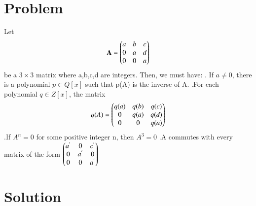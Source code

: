 \documentclass[journal,12pt,twocolumn]{IEEEtran}
\begin{document}
\section{Problem}
Let \begin{align}
\mathbf{A}=\begin{pmatrix}a & b & c\\ 0 & a & d \\ 0 & 0 & a\end{pmatrix} \label{eq:A}
\end{align}
be a $3 \times 3$ matrix where a,b,c,d are integers. Then, we must have:
\newline {}. \quad If $a\neq 0$, there is a polynomial  $p \in Q[x]$ such that p(A) is the inverse of A.
\newline {}.\quad For each polynomial $q \in Z[x]$, the matrix
\begin{align}
q(A)=\begin{pmatrix}q(a) & q(b) & q(c)\\ 0 & q(a) & q(d)\\ 0 & 0 & q(a)\end{pmatrix} \label{eq:q(A)}
\end{align}
\newline {}.\quad If $ A^n=0$ for some positive integer n, then $A^3=0$
\newline {}.\quad A commutes with every matrix of the form $\begin{pmatrix}a^{'} & 0 & c^{'} \\ 0 & a^{'} & 0 \\ 0 & 0 & a^{'}\end{pmatrix}$ 
\section{Solution}
\end{document}
